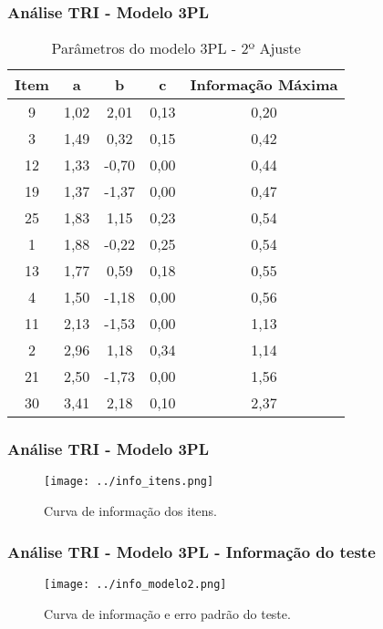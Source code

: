 \documentclass{beamer}
\begin{document}
\begin{frame}
	\frametitle{Análise TRI - Modelo 3PL}
	
	\begin{table}[ht]
		\centering
			\caption{Parâmetros do modelo 3PL - 2º Ajuste}
		\scriptsize %
		\begin{tabular}{ccccc}
			\hline
			\textbf{Item} & \textbf{a} & \textbf{b} & \textbf{c} & \textbf{Informação Máxima} \\ 
			\hline 
			9  & 1,02 & 2,01 & 0,13 & 0,20 \\ 
			3  & 1,49 & 0,32 & 0,15 & 0,42 \\ 
			12 & 1,33 & -0,70 & 0,00 & 0,44 \\ 
			19 & 1,37 & -1,37 & 0,00 & 0,47 \\ 
			25 & 1,83 & 1,15 & 0,23 & 0,54 \\ 
			1  & 1,88 & -0,22 & 0,25 & 0,54 \\ 
			13 & 1,77 & 0,59 & 0,18 & 0,55 \\ 
			4  & 1,50 & -1,18 & 0,00 & 0,56 \\ 
			11 & 2,13 & -1,53 & 0,00 & 1,13 \\ 
			2  & 2,96 & 1,18 & 0,34 & 1,14 \\ 
			21 & 2,50 & -1,73 & 0,00 & 1,56 \\ 
			30 & 3,41 & 2,18 & 0,10 & 2,37 \\ 
			\hline
		\end{tabular}%
	\end{table}
	
\end{frame}

	
	\begin{frame}
		
		\frametitle{Análise TRI - Modelo 3PL}
		\begin{figure}
				\caption{Curva de informação dos itens.}
				\texttt{[image: ../info\_itens.png]}
		\end{figure}
	
	\end{frame}	
	
	\begin{frame}
		
		\frametitle{Análise TRI - Modelo 3PL - Informação do teste}
		\begin{figure}
			\caption{Curva de informação e erro padrão do teste.}
	  	    \texttt{[image: ../info\_modelo2.png]}
		\end{figure}
		
	\end{frame}	
	
\end{document}
